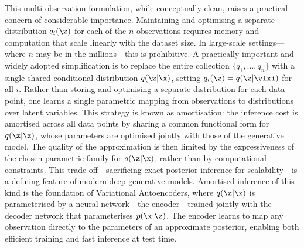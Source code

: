 This multi-observation formulation, while conceptually clean, raises a practical concern of
considerable importance. Maintaining and optimising a separate distribution $q_i(\z)$ for
each of the $n$ observations requires memory and computation that scale linearly with the
dataset size. In large-scale settings---where $n$ may be in the millions---this is
prohibitive. A practically important and widely adopted simplification is to replace the
entire collection $\{q_1,\ldots,q_n\}$ with a single shared conditional distribution
$q(\z|\x)$, setting $q_i(\z) = q(\z|\vlxi)$ for all $i$. Rather than storing and optimising a
separate distribution for each data point, one learns a single parametric mapping from
observations to distributions over latent variables. This strategy is known as
\alert{amortisation}: the inference cost is amortised across all data points by sharing a
common functional form for $q(\z|\x)$, whose parameters are optimised jointly with those
of the generative model. The quality of the approximation is then limited by the
expressiveness of the chosen parametric family for $q(\z|\x)$, rather than by
computational constraints. This trade-off---sacrificing exact posterior inference for
scalability---is a defining feature of modern deep generative models. Amortised inference
of this kind is the foundation of Variational Autoencoders, where $q(\z|\x)$ is
parameterised by a neural network---the encoder---trained jointly with the decoder network
that parameterises $p(\x|\z)$. The encoder learns to map any observation directly to the
parameters of an approximate posterior, enabling both efficient training and fast inference
at test time.

%